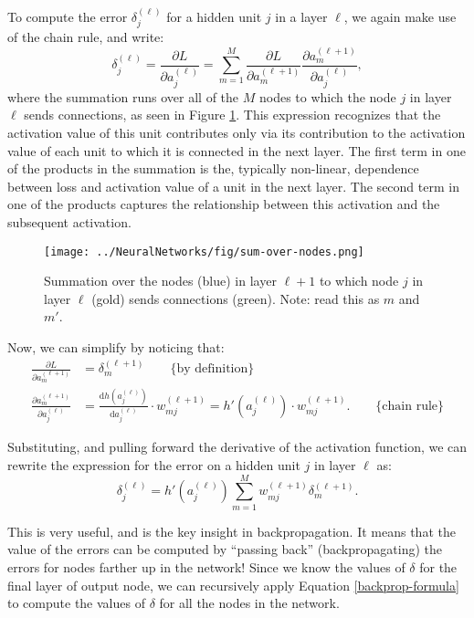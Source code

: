 To compute the error $\delta^{(\ell)}_{j}$ for a hidden unit $j$ in a layer $\ell$, we again make use of the chain rule, and write:
%
\begin{equation} \label{backprop-for-deltas}
	\delta^{(\ell)}_{j} = \frac{\partial L}{\partial a^{(\ell)}_{j}} = \sum_{m=1}^{M} \frac{\partial L}{\partial a^{(\ell+1)}_{m}} \frac{\partial a^{(\ell+1)}_{m}}{\partial a_{j}^{(\ell)}}, 
\end{equation}
where the summation runs over all of the $M$ nodes to which the node $j$ in layer $\ell$ sends connections, as seen in Figure \ref{fig:sum-over-nodes}. This expression recognizes that the activation value of this unit contributes only via its contribution to the activation value of each unit to which it is connected in the next layer. The first term in
one of the  products in the summation is the, typically non-linear, dependence between loss and activation value of a unit in the next layer. The second term in one of the products captures the relationship between this activation and the subsequent activation.
%
%
\begin{figure}
    \centering
    \texttt{[image: ../NeuralNetworks/fig/sum-over-nodes.png]}
    \caption{Summation over the nodes (blue) in layer $\ell+1$ to which node $j$ in layer $\ell$ (gold) sends connections (green). Note: read this as $m$ and $m'$.}
    \label{fig:sum-over-nodes}
\end{figure}

Now, we can simplify by noticing that:
%
\begin{align}
  \frac{\partial L}{\partial a_m^{(\ell+1)}}&=\delta^{(\ell+1)}_m \quad\quad\mbox{\{by definition\}}\\
  \frac{\partial a_m^{(\ell+1)}}{\partial a_j^{(\ell)}}&=\frac{\mathrm{d}h(a_j^{(\ell)})}{\mathrm{d}a_j^{(\ell)}}\cdot w^{(\ell+1)}_{mj}=h'(a_j^{(\ell)})\cdot w_{mj}^{(\ell+1)}. \quad\quad\mbox{\{chain rule\}}
\end{align}

Substituting, and pulling forward the derivative of the activation function, we can rewrite the expression for the error on a hidden unit $j$ in layer $\ell$ as:
%
\begin{equation} \label{backprop-formula}
	\delta^{(\ell)}_{j} = h'(a^{(\ell)}_{j}) \sum_{m=1}^{M} w^{(\ell+1)}_{mj} \delta^{(\ell+1)}_{m}.
      \end{equation}

      This is very useful, and is the key insight in backpropagation.  It means that the value of the errors  can be computed by ``passing back'' (backpropagating) the errors for  nodes farther up in the network! 
%
Since we know the values of $\delta$ for the final layer of output node, we can recursively apply Equation \ref{backprop-formula} to compute the values of $\delta$ for all the nodes in the network.

